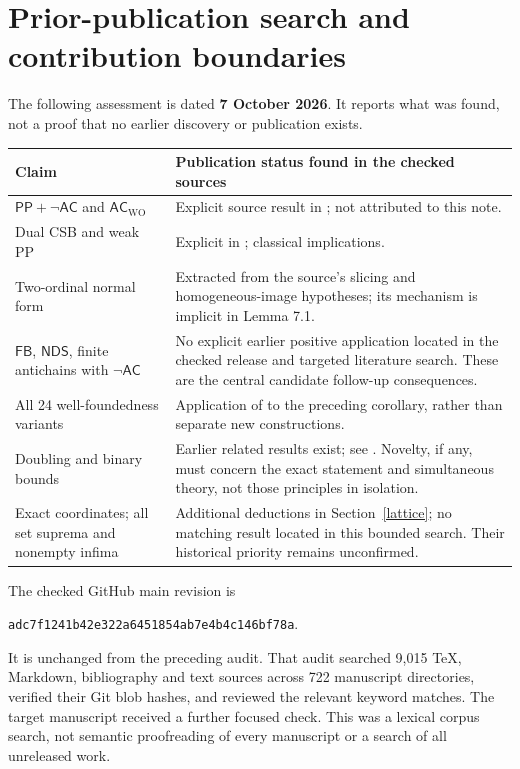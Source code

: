 \documentclass[11pt,a4paper]{article}
\newcommand{\AC}{\mathsf{AC}}
\newcommand{\ACWO}{\mathsf{AC}_{\mathrm{WO}}}
\newcommand{\PP}{\mathsf{PP}}
\newcommand{\NDS}{\mathsf{NDS}}
\newcommand{\FB}{\mathsf{FB}}
\theoremstyle{definition}
\theoremstyle{remark}
\begin{document}
\section{Prior-publication search and contribution boundaries}\label{novelty}

The following assessment is dated \textbf{7 October 2026}. It reports what was found, not a proof that no earlier discovery or publication exists.

\begin{longtable}{>{\raggedright\arraybackslash}p{.29\linewidth}>{\raggedright\arraybackslash}p{.64\linewidth}}
\toprule
Claim & Publication status found in the checked sources\\
\midrule
\endhead
$\PP+\neg\AC$ and $\ACWO$ & Explicit source result in \cite{OpenAI}; not attributed to this note.\\[5pt]
Dual CSB and weak PP & Explicit in \cite[Remark 7.3]{OpenAI}; classical implications.\\[5pt]
Two-ordinal normal form & Extracted from the source's slicing and homogeneous-image hypotheses; its mechanism is implicit in Lemma 7.1.\\[5pt]
$\FB$, $\NDS$, finite antichains with $\neg\AC$ & No explicit earlier positive application located in the checked release and targeted literature search. These are the central candidate follow-up consequences.\\[5pt]
All 24 well-foundedness variants & Application of \cite[Proposition 9.8]{BK} to the preceding corollary, rather than separate new constructions.\\[5pt]
Doubling and binary bounds & Earlier related results exist; see \cite{Jech,HH,Rubin}. Novelty, if any, must concern the exact statement and simultaneous theory, not those principles in isolation.\\[5pt]
Exact coordinates; all set suprema and nonempty infima & Additional deductions in Section~\ref{lattice}; no matching result located in this bounded search. Their historical priority remains unconfirmed.\\
\bottomrule
\end{longtable}

The checked GitHub main revision is
\begin{center}\small\texttt{adc7f1241b42e322a6451854ab7e4b4c146bf78a}.
\end{center}
It is unchanged from the preceding audit. That audit searched 9,015 TeX, Markdown, bibliography and text sources across 722 manuscript directories, verified their Git blob hashes, and reviewed the relevant keyword matches. The target manuscript received a further focused check. This was a lexical corpus search, not semantic proofreading of every manuscript or a search of all unreleased work.
\end{document}
